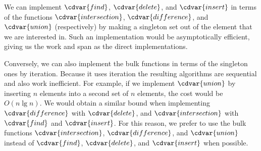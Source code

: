 

\begin{gram}
We can implement $\cdvar{find}$, $\cdvar{delete}$, and $\cdvar{insert}$ in terms of
the functions $\cdvar{intersection}$, $\cdvar{difference}$, and $\cdvar{union}$
(respectively) by making a singleton set out of the element that we
are interested in.
%
Such an implementation would be asymptotically efficient, giving us
the work and span as the direct implementations.
%

Conversely, we can also implement the bulk functions in terms of the
singleton ones by iteration.
%
Because it uses iteration the resulting algorithms are
sequential and also work inefficient.
%
For example, if we implement $\cdvar{union}$ by inserting
$n$ elements into a second set of $n$ elements, the cost would be $O(n
\lg n)$.  
%
We would obtain a similar bound when implementing
$\cdvar{difference}$ with $\cdvar{delete}$, and $\cdvar{intersection}$ with
$\cdvar{find}$ and $\cdvar{insert}$.
%
For this reason, we prefer to use the bulk functions $\cdvar{intersection}$, $\cdvar{difference}$, and $\cdvar{union}$ instead
of $\cdvar{find}$, $\cdvar{delete}$, and $\cdvar{insert}$ when possible.
\end{gram}


